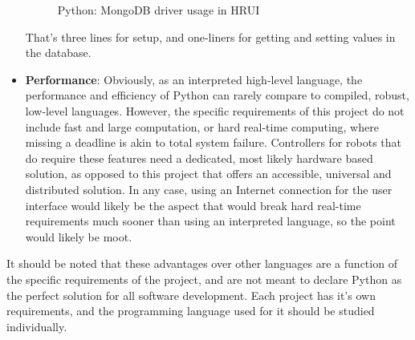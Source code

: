 \begin{itemize}
\begin{figure}[H]
  \caption{Python: MongoDB driver usage in HRUI}
  \end{figure}
  That's three lines for setup, and one-liners for getting and setting values in the database.
  \item \textbf{Performance}: Obviously, as an interpreted high-level language, the performance and efficiency of Python can rarely 
  compare to compiled, robust, low-level languages. However, the specific requirements of this project do not include fast and large 
  computation, or hard real-time computing, where missing a deadline is akin to total system failure. Controllers for robots that do 
  require these features need a dedicated, most likely hardware based solution, as opposed to this project that offers an accessible, 
  universal and distributed solution. In any case, using an Internet connection for the user interface would likely be the aspect that 
  would break hard real-time requirements much sooner than using an interpreted language, so the point would likely be moot.
\end{itemize}
It should be noted that these advantages over other languages are a function of the specific requirements of the project, and are not 
meant to declare Python as the perfect solution for all software development. Each project has it's own requirements, and the 
programming language used for it should be studied individually.
